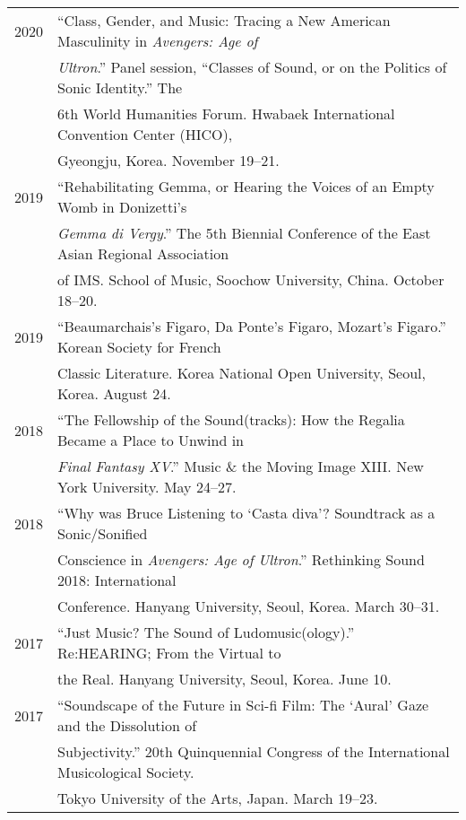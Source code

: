 \documentclass[letter,11pt]{article}
\begin{document}
  \hspace*{-0.25cm}
  \begin{tabular}{p{2.5cm} p{12.5cm}}
    2020 & “Class, Gender, and Music: Tracing a New American Masculinity in \textit{Avengers: Age of}\\
    & \textit{Ultron}.” Panel session, “Classes of Sound, or on the Politics of Sonic Identity.” The\\
    & 6th World Humanities Forum. Hwabaek International Convention Center (HICO),\\
    & Gyeongju, Korea. November 19–21.\\[2mm]
  
    2019 & “Rehabilitating Gemma, or Hearing the Voices of an Empty Womb in
    Donizetti’s\\
    & \textit{Gemma di Vergy}.” The 5th Biennial Conference of the East Asian
    Regional Association\\
    & of IMS. School of Music, Soochow University, China. October 18–20.\\[2mm]
  
    2019 & “Beaumarchais’s Figaro, Da Ponte’s Figaro, Mozart’s Figaro.” Korean
    Society for French\\
    & Classic Literature. Korea National Open University, Seoul, Korea. August
    24.\\[2mm]
    
    2018 & ``The Fellowship of the Sound(tracks): How the Regalia Became a
    Place to Unwind in\\
    & \textit{Final Fantasy XV}.'' Music \& the Moving Image XIII. New York
    University. May 24--27.\\[2mm]
    
    2018 & “Why was Bruce Listening to ‘Casta diva’? Soundtrack as a Sonic/Sonified\\
    & Conscience in \textit{Avengers: Age of Ultron}.” Rethinking Sound 2018: International\\
    & Conference. Hanyang University, Seoul, Korea. March 30--31.\\[2mm]
  
    2017 & “Just Music? The Sound of Ludomusic(ology).” Re:HEARING; From the
    Virtual to\\
    & the Real. Hanyang University, Seoul, Korea. June 10.\\[2mm]
  
    2017 & “Soundscape of the Future in Sci-fi Film: The ‘Aural’ Gaze and the
    Dissolution of\\
    & Subjectivity.” 20th Quinquennial Congress of the International
    Musicological Society.\\
    & Tokyo University of the Arts, Japan. March 19--23.\\[2mm]
  

\end{tabular}
\end{document}
